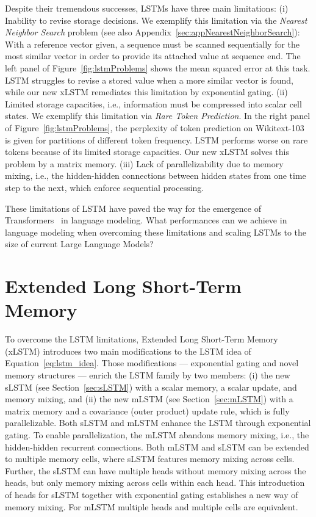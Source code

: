 Despite their tremendous successes, LSTMs have three main limitations: (i) Inability to revise storage decisions. We exemplify this limitation via the 
{\it Nearest Neighbor Search} problem (see also Appendix~\ref{sec:appNearestNeighborSearch}): 
With a reference vector given, a sequence must be scanned sequentially for the most similar vector in order to provide its attached value at sequence end. The left panel of Figure~\ref{fig:lstmProblems} shows the mean squared error at this task. LSTM struggles to revise a stored value when a more similar vector is found, while our new xLSTM remediates this limitation by exponential gating. (ii) Limited storage capacities, i.e., information must be compressed into scalar cell states. We exemplify this limitation via {\it Rare Token Prediction}. In the right panel of Figure~\ref{fig:lstmProblems},
the perplexity of token prediction on Wikitext-103~\citep{Merity:17} is given for partitions of different token frequency. LSTM performs worse on rare tokens because of its limited storage capacities. Our new xLSTM solves this problem by a matrix memory. (iii) Lack of parallelizability due to memory mixing, i.e., the hidden-hidden connections between hidden states from one time step to the next, which enforce sequential processing. 

These limitations of LSTM have paved the way for the emergence of Transformers~\citep{Vaswani:17} in language modeling. What performances can we achieve in language modeling when overcoming these limitations and scaling LSTMs to the size of current Large Language Models? 

\section{Extended Long Short-Term Memory}
\label{sec:xLSTM}

To overcome the LSTM limitations, Extended Long Short-Term Memory (xLSTM) introduces two main modifications to the LSTM idea of Equation~\eqref{eq:lstm_idea}.
Those modifications --- exponential gating and novel memory structures --- enrich the LSTM family by two members: (i) the new sLSTM (see Section~\ref{sec:sLSTM}) with a scalar memory, a scalar update, and memory mixing, and (ii) the new mLSTM (see Section~\ref{sec:mLSTM}) with a matrix memory and a covariance (outer product) update rule, which is fully parallelizable. Both sLSTM and mLSTM enhance the LSTM through exponential gating. To enable parallelization, the mLSTM abandons memory mixing, i.e., the hidden-hidden recurrent connections. Both mLSTM and sLSTM can be extended to multiple memory cells, where sLSTM features memory mixing across cells. Further, the sLSTM can have multiple heads without memory mixing across the heads, but only memory mixing across cells within each head. This introduction of heads for sLSTM together with exponential gating establishes a new way of memory mixing. For mLSTM multiple heads and multiple cells are equivalent.

